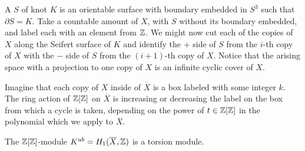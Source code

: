 A  $S$ of knot $K$ is an orientable surface with boundary embedded in $S^3$ such that $\partial S=K$. Take a countable amount of $X$, with $S$ without its boundary embedded, and label each with an element from $\operatorname{\mathbb{Z}}$. We might now cut each of the copies of $X$ along the Seifert surface of $K$ and identify the $+$ side of $S$ from the $i$-th copy of $X$ with the $-$ side of $S$ from the $(i+1)$-th copy of $X$. Notice that the arising space with a projection to one copy of $X$ is an infinite cyclic cover of $X$.

Imagine that each copy of $X$ inside of $\overline{X}$ is a box labeled with some integer $k$. The ring action of $\operatorname{\mathbb{Z}}[\operatorname{\mathbb{Z}}]$ on $\overline{X}$ is increasing or decreasing the label on the box from which a cycle is taken, depending on the power of $t\in\operatorname{\mathbb{Z}}[\operatorname{\mathbb{Z}}]$ in the polynomial which we apply to $\overline{X}$.

\begin{proposition}\label{prop: modul alexandera jest torsyjny}
  The $\operatorname{\mathbb{Z}}[\operatorname{\mathbb{Z}}]$-module $K^{ab}=H_1(\overline{X}, \operatorname{\mathbb{Z}})$ is a torsion module.
\end{proposition}

